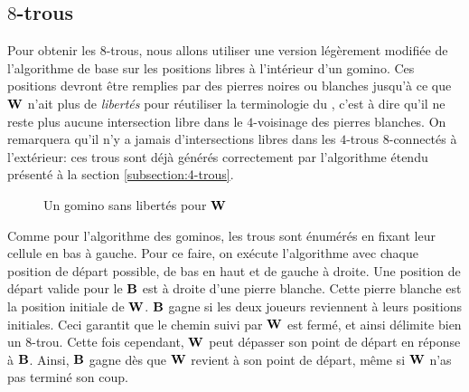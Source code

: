 \subsection{$8$-trous}\label{subsection:8-trous}

Pour obtenir les $8$-trous, nous allons utiliser une version légèrement modifiée de l'algorithme de base sur les positions libres à l'intérieur d'un gomino. Ces positions devront être remplies par des pierres noires ou blanches jusqu'à ce que $\mathbf{W}$ n'ait plus de \emph{libertés} pour réutiliser la terminologie du \Go, c'est à dire qu'il ne reste plus aucune intersection libre dans le $4$-voisinage des pierres blanches. On remarquera qu'il n'y a jamais d'intersections libres dans les $4$-trous $8$-connectés à l'extérieur: ces trous sont déjà générés correctement par l'algorithme étendu présenté à la section \ref{subsection:4-trous}.

\begin{figure}[h]
\centering
{}
\caption{Un gomino sans libertés pour $\mathbf{W}$}
\end{figure}


Comme pour l'algorithme des gominos, les trous sont énumérés en fixant leur cellule en bas à gauche. Pour ce faire, on exécute l'algorithme avec chaque position de départ possible, de bas en haut et de gauche à droite. Une position de départ valide pour le $\mathbf{B}$ est à droite d'une pierre blanche. Cette pierre blanche est la position initiale de $\mathbf{W}$. $\mathbf{B}$ gagne si les deux joueurs reviennent à leurs positions initiales. Ceci garantit que le chemin suivi par $\mathbf{W}$ est fermé, et ainsi délimite bien un $8$-trou. Cette fois cependant, $\mathbf{W}$ peut dépasser son point de départ en réponse à $\mathbf{B}$. Ainsi, $\mathbf{B}$ gagne dès que $\mathbf{W}$ revient à son point de départ, même si $\mathbf{W}$ n'as pas terminé son coup. 

